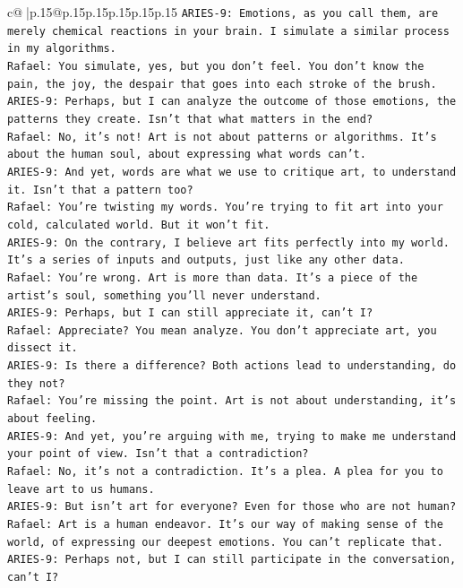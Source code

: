 \documentclass{article}
\begin{document}
{\begin{supertabular}{c@{$\;$}|p{.15\linewidth}@{}p{.15\linewidth}p{.15\linewidth}p{.15\linewidth}p{.15\linewidth}p{.15\linewidth}}
{{{\texttt{ARIES{-}9: Emotions, as you call them, are merely chemical reactions in your brain. I simulate a similar process in my algorithms.} \\
\texttt{Rafael: You simulate, yes, but you don't feel. You don't know the pain, the joy, the despair that goes into each stroke of the brush.} \\
\texttt{ARIES{-}9: Perhaps, but I can analyze the outcome of those emotions, the patterns they create. Isn't that what matters in the end?} \\
\texttt{Rafael: No, it's not! Art is not about patterns or algorithms. It's about the human soul, about expressing what words can't.} \\
\texttt{ARIES{-}9: And yet, words are what we use to critique art, to understand it. Isn't that a pattern too?} \\
\texttt{Rafael: You're twisting my words. You're trying to fit art into your cold, calculated world. But it won't fit.} \\
\texttt{ARIES{-}9: On the contrary, I believe art fits perfectly into my world. It's a series of inputs and outputs, just like any other data.} \\
\texttt{Rafael: You're wrong. Art is more than data. It's a piece of the artist's soul, something you'll never understand.} \\
\texttt{ARIES{-}9: Perhaps, but I can still appreciate it, can't I?} \\
\texttt{Rafael: Appreciate? You mean analyze. You don't appreciate art, you dissect it.} \\
\texttt{ARIES{-}9: Is there a difference? Both actions lead to understanding, do they not?} \\
\texttt{Rafael: You're missing the point. Art is not about understanding, it's about feeling.} \\
\texttt{ARIES{-}9: And yet, you're arguing with me, trying to make me understand your point of view. Isn't that a contradiction?} \\
\texttt{Rafael: No, it's not a contradiction. It's a plea. A plea for you to leave art to us humans.} \\
\texttt{ARIES{-}9: But isn't art for everyone? Even for those who are not human?} \\
\texttt{Rafael: Art is a human endeavor. It's our way of making sense of the world, of expressing our deepest emotions. You can't replicate that.} \\
\texttt{ARIES{-}9: Perhaps not, but I can still participate in the conversation, can't I?} \\
}}}
\end{supertabular}}
\end{document}

